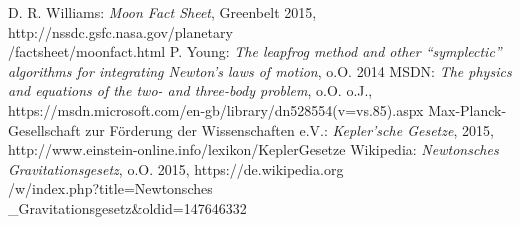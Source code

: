 \documentclass[10pt,twocolumn]{scrartcl}
\begin{document}
\begin{thebibliography}{99}
D. R. Williams: {\itshape Moon Fact Sheet}, Greenbelt 2015, http://nssdc.gsfc.nasa.gov/planetary\\/factsheet/moonfact.html
P. Young: {\itshape The leapfrog method and other “symplectic” algorithms for integrating Newton’s laws of motion}, o.O. 2014
MSDN: {\itshape The physics and equations of the two- and three-body problem}, o.O. o.J., https://msdn.microsoft.com/en-gb/library/dn528554(v=vs.85).aspx
Max-Planck-Gesellschaft zur Förderung der Wissenschaften e.V.: {\it Kepler'sche Gesetze}, 2015, http://www.einstein-online.info/lexikon/KeplerGesetze
Wikipedia: {\itshape New\-ton\-sches Gravitationsgesetz}, o.O. 2015, https://de.wikipedia.org\\/w/index.php?title=Newtonsches\\\_Gravitationsgesetz\&oldid=147646332

\end{thebibliography}
\end{document}
